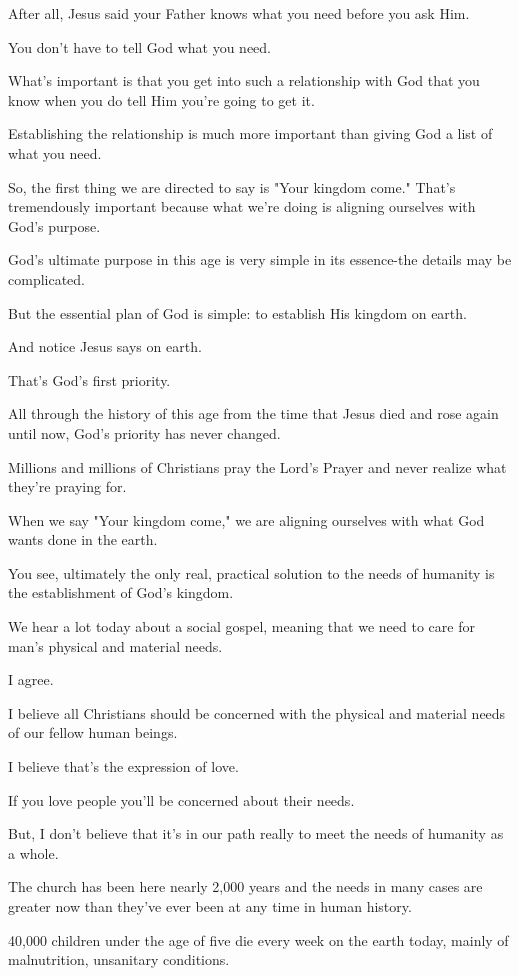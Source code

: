 \documentclass[11pt]{article}
\begin{document}
After all, Jesus said your Father knows what
you need before you ask Him.

You don't have to tell God what you need.

What's important is that you get into such a
relationship with God that you know when you
do tell Him you're going to get it.

Establishing the relationship is much more
important than giving God a list of what you
need.

So, the first thing we are directed to say is
"Your kingdom come." That's tremendously
important because what we're doing is aligning
ourselves with God's purpose.

God's ultimate purpose in this age is very
simple in its essence-the details may be
complicated.

But the essential plan of God is simple: to
establish His kingdom on earth.

And notice Jesus says on earth.

That's God's first priority.

All through the history of this age from the
time that Jesus died and rose again until now,
God's priority has never changed.

Millions and millions of Christians pray the
Lord's Prayer and never realize what they're
praying for.

When we say "Your kingdom come," we are
aligning ourselves with what God wants done in
the earth.

You see, ultimately the only real, practical
solution to the needs of humanity is the
establishment of God's kingdom.

We hear a lot today about a social gospel,
meaning that we need to care for man's
physical and material needs.

I agree.

I believe all Christians should be concerned
with the physical and material needs of our
fellow human beings.

I believe that's the expression of love.

If you love people you'll be concerned about
their needs.

But, I don't believe that it's in our path
really to meet the needs of humanity as a
whole.

The church has been here nearly 2,000 years
and the needs in many cases are greater now
than they've ever been at any time in human
history.

40,000 children under the age of five die
every week on the earth today, mainly of
malnutrition, unsanitary conditions.
\end{document}
